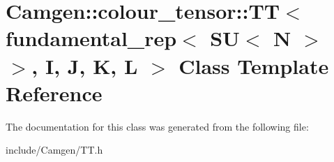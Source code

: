 \hypertarget{a00531}{\section{Camgen\-:\-:colour\-\_\-tensor\-:\-:T\-T$<$ fundamental\-\_\-rep$<$ S\-U$<$ N $>$ $>$, I, J, K, L $>$ Class Template Reference}
\label{a00531}
}


The documentation for this class was generated from the following file\-:\begin{DoxyCompactItemize}
\item 
include/\-Camgen/T\-T.\-h\end{DoxyCompactItemize}
